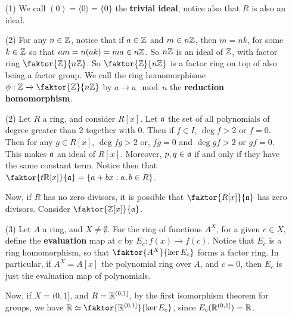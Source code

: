 \begin{example}\label{example_5.10}
  \begin{enumerate}
    \item[(1)] We call $(0)=\langle 0 \rangle=\{0\}$ the \textbf{trivial ideal},
      notice also that $R$ is also an ideal.

    \item[(2)] For any $n \in \mathbb{Z}$, notice that if $a \in \mathbb{Z}$ and $m \in
      n\mathbb{Z}$, then  $m=nk$, for some  $k \in \mathbb{Z}$ so that  $am=n(ak)=ma \in
      n\mathbb{Z}$. So $n\mathbb{Z}$ is an ideal of $\mathbb{Z}$, with factor ring
      $\faktor{\Z}{n\Z}$. So $\faktor{\Z}{n\Z}$ is a factor ring on top of
      also being a factor group. We call the ring homomorphisme $\phi:\Z
      \xrightarrow{} \faktor{\Z}{n\Z}$ by $a \xrightarrow{} a \mod{n}$ the
      \textbf{reduction homomorphism}.

    \item[(2)] Let $R$ a ring, and consider  $R[x]$. Let $\mathfrak{a}$ the set of all
      polynomials of degree greater than $2$ together with $0$. Then if
      $f \in I$,  $\deg{f}>2$ or $f=0$. Then for any  $g \in R[x]$,
      $\deg{fg}>2$ or, $fg=0$ and $\deg{gf}>2$ or $gf=0$. This
      makes  $\mathfrak{a}$ an ideal of $R[x]$. Moreover, $p,q \in \mathfrak{a}$ if and
      only if they have the same constant term. Notice then that
      $\faktor{t\R[x]}{\af}=\{a+bx : a,b \in R\}$.

      Now, if $R$ has no zero divisors, it is possible that
      $\faktor{R[x]}{\af}$ has zero divisors. Consider
      $\faktor{\Z[x]}{\af}$.

    \item[(3)] Let $A$ a ring, and  $X \neq \emptyset$. For the ring of
      functions $A^X$, for a given $c \in X$, define the
      \textbf{evaluation} map at $c$ by $E_c:f(x) \xrightarrow{} f(c)$.
      Notice that $E_c$ is a ring homomorphism, so that
      $\faktor{A^X}{\ker{E_c}}$ forms a factor ring. In particular, if
      $A^X=A[x]$ the polynomial ring over $A$, and  $c=0$, then  $E_c$ is
      just the evaluation map of polynomials.

      Now, if  $X=(0,1]$, and $R=\mathbb{R}^{(0,1]}$, by the first isomorphism
      theorem for groups, we have $\R \simeq \faktor{\R^{(0,1]}}{\ker{E_c}}$,
      since $E_c(\mathbb{R}^{(0,1]})=\mathbb{R}$.


\end{enumerate}
\end{example}
